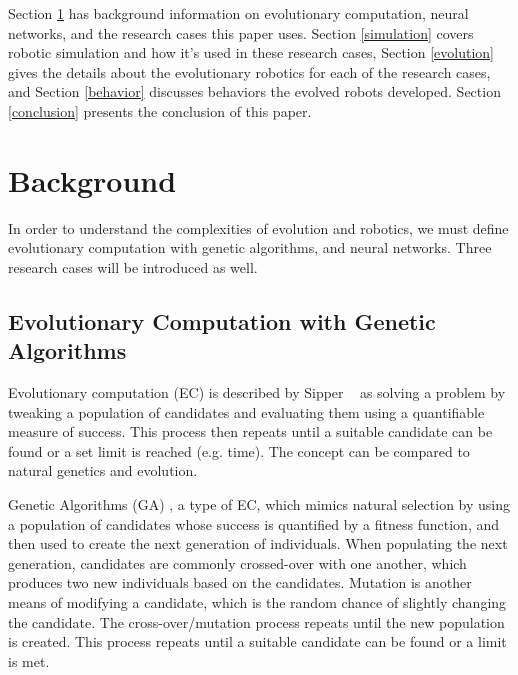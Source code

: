 \documentclass{sig-alternate}
\begin{document}
   Section \ref{background}  has  background information on evolutionary computation, neural networks, and the research cases this paper uses. Section \ref{simulation} covers robotic simulation and how it's used in these research cases, Section \ref{evolution} gives the details about the evolutionary robotics for each of the research cases, and Section \ref{behavior} discusses behaviors the evolved robots developed. Section \ref{conclusion} presents the conclusion of this paper.
 
 
\section{Background}\label{background}
In order to understand the complexities of evolution and robotics, we must define evolutionary computation with genetic algorithms, and neural networks. Three research cases will be introduced as well.

 \subsection{Evolutionary Computation with Genetic Algorithms}\label{background EC}
  Evolutionary computation (EC) is described by Sipper ~\cite{Sipper2011Win} as solving a problem by tweaking a population of candidates and evaluating them using a quantifiable measure of success. This process then repeats until a suitable candidate can be found or a set limit is reached (e.g. time). The concept can be compared to natural genetics and evolution.
  
  Genetic Algorithms (GA) \cite{wiki:GeneticAlgorithms}, a type of EC, which mimics natural selection by using a population of candidates whose success is quantified by a fitness function, and then used to create the next generation of individuals. When populating the next generation, candidates are commonly crossed-over with one another, which produces two new individuals based on the candidates. Mutation is another means of modifying a candidate, which is the random chance  of slightly changing the candidate. The cross-over/mutation process repeats until the new population is created. This process  repeats until a suitable candidate can be found or a limit is met.
  
\end{document}
